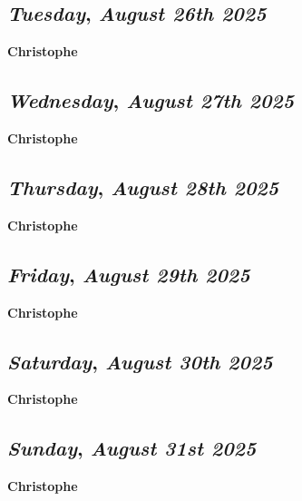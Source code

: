 \def\day{\textit{August 26th 2025}}
\def\weekday{\textit{Tuesday}}
\subsection*{\weekday, \day}
\textbf {Christophe}

\def\day{\textit{August 27th 2025}}
\def\weekday{\textit{Wednesday}}
\subsection*{\weekday, \day}
\textbf {Christophe}

\def\day{\textit{August 28th 2025}}
\def\weekday{\textit{Thursday}}
\subsection*{\weekday, \day}
\textbf {Christophe}

\def\day{\textit{August 29th 2025}}
\def\weekday{\textit{Friday}}
\subsection*{\weekday, \day}
\textbf {Christophe}

\def\day{\textit{August 30th 2025}}
\def\weekday{\textit{Saturday}}
\subsection*{\weekday, \day}
\textbf {Christophe}

\def\day{\textit{August 31st 2025}}
\def\weekday{\textit{Sunday}}
\subsection*{\weekday, \day}
\textbf {Christophe}

